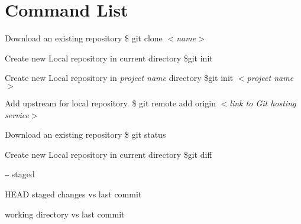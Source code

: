 \chapter{Command List}
\twocolumn

\begin{tcolorbox}[ titleBox, title=SETUP]
    \begin{tcolorbox}[innerBox]
        Download an existing repository
      \tcblower
        \$ git clone $<$\textit{name}$>$
    \end{tcolorbox}

    \begin{tcolorbox}[innerBox]
        Create new Local repository in current directory
      \tcblower
        \$git init
    \end{tcolorbox}
    
    \begin{tcolorbox}[innerBox]
        Create new Local repository in \textit{project name} directory
      \tcblower
        \$git init $<$\textit{project name}$>$
    \end{tcolorbox}

    \begin{tcolorbox}[innerBox]
        Add upstream for local repository.
      \tcblower
        \$ git remote add origin $<$\textit{link to Git hosting service}$>$
    \end{tcolorbox}
\end{tcolorbox}


\begin{tcolorbox}[ titleBox, title=SNAPSHOT]
    \begin{tcolorbox}[innerBox]
        Download an existing repository
      \tcblower
        \$ git status
    \end{tcolorbox}

    \begin{tcolorbox}[innerBox]
        Create new Local repository in current directory
      \tcblower
        \$git diff
    \end{tcolorbox}
        
    \begin{tcolorbox}[splitBox, lefthand ratio=0.25, fontupper = \small, fontlower = \small]
        \texttt{--}  staged 
        \par\vspace{3mm}
        HEAD
      \tcblower
        staged changes vs last commit
        \par\vspace{3mm}
        working directory vs last commit
    \end{tcolorbox}
\end{tcolorbox}


